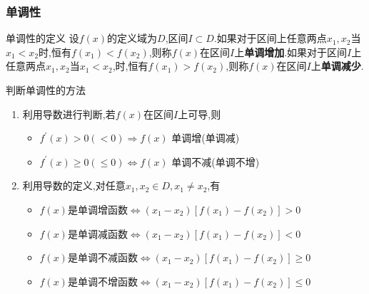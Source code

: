 \documentclass[8pt a4paper, oneside, UTF8]{ctexbook}  %
\begin{document}
\begin{sloppypar}
    \subsubsection{单调性}
    \begin{defn}{单调性的定义}{}
        设$f(x)$的定义域为$D$,区间$I \subset D$.如果对于区间上任意两点$x_1,x_2$当$x_1 < x_2$时,恒有$f(x_1) < f(x_2)$,则称$f(x)$在区间$I$上\textbf{单调增加}.如果对于区间$I$上任意两点$x_1,x_2$当$x_1<x_2$,时,恒有$f(x_1)>f(x_2)$,则称$f(x)$在区间$I$上\textbf{单调减少}.
    \end{defn}
    判断单调性的方法
    \begin{enumerate}
        \item 利用导数进行判断,若$f(x)$在区间$I$上可导,则
        \begin{itemize}
            \item $f^{\prime}(x)>0(<0)\Rightarrow f(x)$ 单调增(单调减)
            \item $f^{\prime}(x)\geqslant0(\leqslant0)\Leftrightarrow f(x)$ 单调不减(单调不增)
        \end{itemize}
        \item 利用导数的定义,对任意$x_1,x_2\in D,x_1\neq x_2$,有
        \begin{itemize}
            \item $f\left(x\right)$是单调增函数$\Leftrightarrow\left(x_{1}-x_{2}\right)\left[f\left(x_{1}\right)-f\left(x_{2}\right)\right]>0$
            \item $f(x)$是单调减函数$\Leftrightarrow(x_{1}-x_{2})[f(x_{1})-f(x_{2})]<0$
            \item $f(x)$是单调不减函数$\Leftrightarrow(x_{1}-x_{2})[f(x_{1})-f(x_{2})]\geqslant0$
            \item $f\left(x\right)$是单调不增函数$\Leftrightarrow\left(x_{1}-x_{2}\right)\left[f\left(x_{1}\right)-f\left(x_{2}\right)\right]\leqslant0$
        \end{itemize}
    \end{enumerate}

\end{sloppypar}
\end{document}
